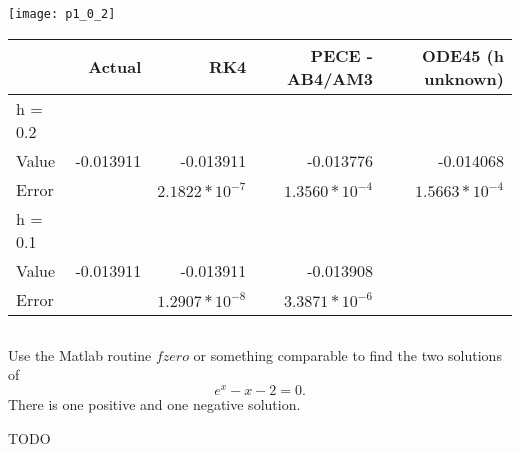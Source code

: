 \documentclass{jhwhw}
\begin{document}
\solution
    \begin{center}
	\texttt{[image: p1\_0\_2]}

	\begin{tabular}[pos]{|l|r|r|r|r|}
	    \hline
	    & Actual	& RK4			& PECE - AB4/AM3	& ODE45 (h unknown) \\ \hline
	    h = 0.2 &&&& \\ \hline
	    Value	& -0.013911	& -0.013911		& -0.013776  & -0.014068 \\ \hline
	    Error	& 		& $2.1822*10^{-7}$	& $1.3560*10^{-4}$ & $1.5663*10^{-4}$\\ \hline
	    h = 0.1 &&&& \\ \hline
	    Value	& -0.013911	& -0.013911		& -0.013908 & \\ \hline
	    Error	& 		& $1.2907*10^{-8}$	& $3.3871*10^{-6}$ & \\ \hline
	\end{tabular}
    \end{center}

    \inputminted[linenos,frame=lines,framesep=2mm]{octave}{p2.m}

\problem{}

    Use the Matlab routine $fzero$ or something comparable to find the two solutions of
    $$ e^x - x - 2 = 0.$$
    There is one positive and one negative solution.

\solution
    
    TODO
\end{document}
